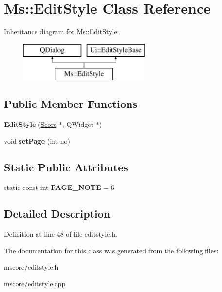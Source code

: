 \hypertarget{class_ms_1_1_edit_style}{}\section{Ms\+:\+:Edit\+Style Class Reference}
\label{class_ms_1_1_edit_style}
Inheritance diagram for Ms\+:\+:Edit\+Style\+:\begin{figure}[H]
\begin{center}
\leavevmode
\includegraphics[height=2.000000cm]{class_ms_1_1_edit_style}
\end{center}
\end{figure}
\subsection*{Public Member Functions}
\begin{DoxyCompactItemize}
\item 
\mbox{\label{class_ms_1_1_edit_style_a4218b3b1e7f585e3b5389a37100bfedc}} 
{\bfseries Edit\+Style} (\hyperlink{class_ms_1_1_score}{Score} $\ast$, Q\+Widget $\ast$)
\item 
\mbox{\label{class_ms_1_1_edit_style_af570c1b77907af950cccfdfe8789ef78}} 
void {\bfseries set\+Page} (int no)
\end{DoxyCompactItemize}
\subsection*{Static Public Attributes}
\begin{DoxyCompactItemize}
\item 
\mbox{\label{class_ms_1_1_edit_style_a5e9d07710e327a6f1d054dfb7061ddc0}} 
static const int {\bfseries P\+A\+G\+E\+\_\+\+N\+O\+TE} = 6
\end{DoxyCompactItemize}


\subsection{Detailed Description}


Definition at line 48 of file editstyle.\+h.



The documentation for this class was generated from the following files\+:\begin{DoxyCompactItemize}
\item 
mscore/editstyle.\+h\item 
mscore/editstyle.\+cpp\end{DoxyCompactItemize}
